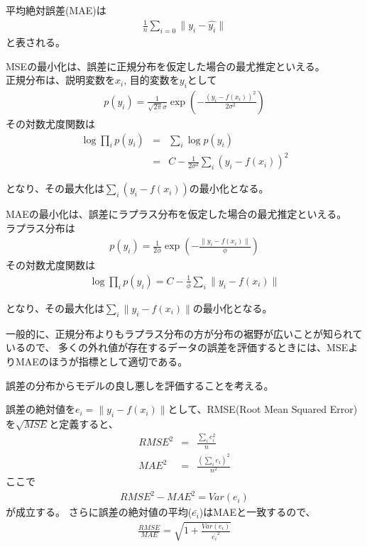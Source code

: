 \documentclass{jsarticle}
\begin{document}
平均絶対誤差(MAE)は
\begin{eqnarray*}
    \frac{1}{n} \sum_{i=0} \|y_i - \hat{y_i}\|
\end{eqnarray*}
と表される。

MSEの最小化は、誤差に正規分布を仮定した場合の最尤推定といえる。 \\
正規分布は、説明変数を$x_i$, 目的変数を$y_i$として
\begin{eqnarray*}
    p(y_i) = \frac{1}{\sqrt{2\pi}\sigma} \exp (-\frac{(y_i - f(x_i))^2}{2 \sigma^2})
\end{eqnarray*}
その対数尤度関数は
\begin{eqnarray*}
    \log \prod_{i} p(y_i) &=& \sum_{i} \log p(y_i) \\
    &=& C - \frac{1}{2\sigma^2} \sum_{i} (y_i - f(x_i))^2
\end{eqnarray*}

となり、その最大化は$\sum_{i} (y_i - f(x_i))$の最小化となる。

MAEの最小化は、誤差にラプラス分布を仮定した場合の最尤推定といえる。 \\
ラプラス分布は
\begin{eqnarray*}
    p(y_i) = \frac{1}{2\phi} \exp (-\frac{\|y_i - f(x_i)\|}{\phi})
\end{eqnarray*}
その対数尤度関数は
\begin{eqnarray*}
    \log \prod_{i} p(y_i)
    = C - \frac{1}{\phi} \sum_{i} \|y_i - f(x_i)\|
\end{eqnarray*}

となり、その最大化は$\sum_{i} \|y_i - f(x_i)\|$の最小化となる。

一般的に、正規分布よりもラプラス分布の方が分布の裾野が広いことが知られているので、
多くの外れ値が存在するデータの誤差を評価するときには、MSEよりMAEのほうが指標として適切である。

\newpage

誤差の分布からモデルの良し悪しを評価することを考える。

誤差の絶対値を$e_i = \|y_i - f(x_i)\|$として、RMSE(Root Mean Squared Error)を$\sqrt{MSE}$と定義すると、
\begin{eqnarray*}
    RMSE^2 &=& \frac{\sum_{i} e_i^2}{n} \\
    MAE^2 &=& \frac{(\sum_{i} e_i)^2}{n^2}
\end{eqnarray*}
ここで
\begin{eqnarray*}
    RMSE^2 - MAE^2 = Var(e_i)
\end{eqnarray*}
が成立する。
さらに誤差の絶対値の平均($\bar{e_i}$)はMAEと一致するので、
\begin{eqnarray*}
\frac{RMSE}{MAE} = \sqrt{1 + \frac{Var(e_i)}{\bar{e_i}^2}}
\end{eqnarray*}
\end{document}
